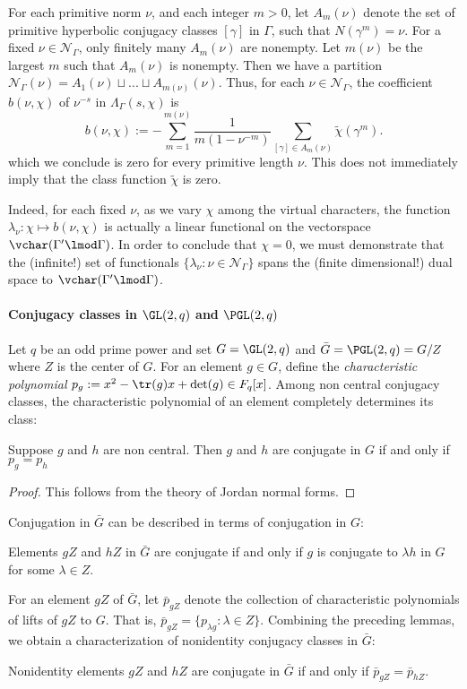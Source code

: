 \documentclass[11pt]{amsart}
\begin{document}
For each primitive norm $\nu$, and each integer $m>0$, let $A_m(\nu)$ denote the set of primitive hyperbolic conjugacy classes $[\gamma]$ in $\Gamma$, such that $N(\gamma^m)=\nu$.
For a fixed $\nu \in \mathcal{N}_\Gamma$, only finitely many $A_m(\nu)$ are nonempty.
Let $m(\nu)$ be the largest $m$ such that $A_m(\nu)$ is nonempty.
Then we have a partition $\mathcal{N}_\Gamma(\nu)=A_1(\nu)\sqcup ...\sqcup A_{m(\nu)}(\nu)$.
Thus, for each $\nu \in \mathcal{N}_\Gamma$, the  coefficient $b(\nu,\chi)$ of $\nu^{-s}$ in $\Lambda_\Gamma(s,\chi)$  is
\[ b(\nu,\chi):= -\sum_{m=1}^{m(\nu)} \frac{1}{m(1-\nu^{-m})} \sum_{[\gamma]\in A_m(\nu)} \tilde{\chi}(\gamma^m).
\]
which we conclude is zero for every primitive length $\nu$.
This does not immediately imply that the class function $\tilde{\chi}$ is zero.

Indeed, for each fixed $\nu$, as we vary $\chi$ among the virtual characters, the function  $\lambda_\nu: \chi \mapsto b(\nu,\chi)$ is actually a linear functional on the vectorspace $\vchar(\Gamma' \lmod \Gamma)$.
In order to conclude that $\chi=0$, we must demonstrate that the (infinite!) set of functionals $\{ \lambda_\nu: \nu \in \mathcal{N}_\Gamma\}$ spans the (finite dimensional!) dual space to $\vchar(\Gamma'\lmod \Gamma)$.
\paragraph{Conjugacy classes in $\GL(2,q)$ and $\PGL(2,q)$}
Let $q$ be an odd prime power and set $G=\GL(2,q)$ and $\bar{G}=\PGL(2,q)=G/ Z$ where $Z$ is the center of $G$.
For an element $g\in G$, define the \emph{characteristic polynomial} $p_{g}:=x^{2}-\tr(g)x+\det(g) \in F_{q}[x]$.
Among non central conjugacy classes, the characteristic polynomial of an element completely determines its class:
\begin{lemma}
	Suppose $g$ and $h$ are non central.
	Then $g$ and $h$ are conjugate in $G$ if and only if $p_{g}=p_{h}$
\end{lemma}
\begin{proof}
	This follows from the theory of Jordan normal forms.
\end{proof}
Conjugation in $\bar{G}$ can be described in terms of conjugation in $G$:
\begin{lemma}
	Elements $gZ$ and $hZ$ in $\bar{G}$ are conjugate if and only if $g$ is conjugate to $\lambda h$ in $G$ for some $\lambda \in Z$.
\end{lemma}
For an element $gZ$ of $\bar{G}$, let $\bar{p}_{gZ}$ denote the collection of characteristic polynomials of lifts of $gZ$ to $G$.
That is, $\bar{p}_{gZ}=\{p_{\lambda g}: \lambda \in Z\}$.
Combining the preceding lemmas, we obtain a characterization of nonidentity conjugacy classes in $\bar{G}$:
\begin{lemma}
	Nonidentity elements $gZ$ and $hZ$ are conjugate in $\bar{G}$ if and only if $\bar{p}_{gZ}=\bar{p}_{hZ}$.
\end{lemma}
\end{document}
